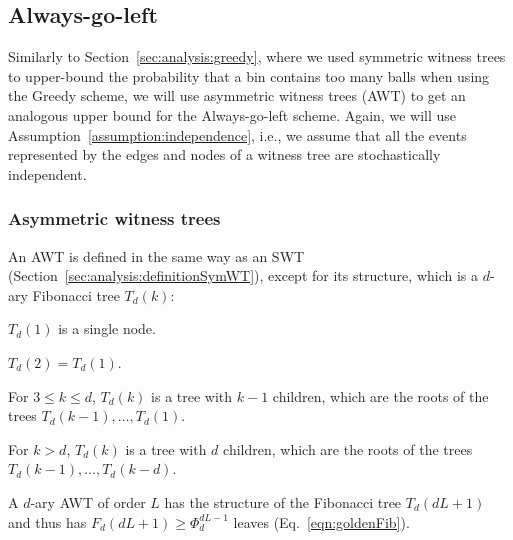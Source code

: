 \documentclass[a4paper,12pt]{article}
\begin{document}
\subsection{Always-go-left}
\label{sec:analysis:alg}
Similarly to Section~\ref{sec:analysis:greedy}, where we used symmetric witness trees to upper-bound the probability that a bin contains too many balls when using the Greedy scheme, we will use asymmetric witness trees (AWT) to get an analogous upper bound for the Always-go-left scheme. Again, we will use Assumption~\ref{assumption:independence}, i.e., we assume that all the events represented by the edges and nodes of a witness tree are stochastically independent.

\subsubsection{Asymmetric witness trees}
\label{sec:analysis:definitionAsymWT}
An AWT is defined in the same way as an SWT  (Section~\ref{sec:analysis:definitionSymWT}), except for its structure, which is a $d$-ary Fibonacci tree $T_d\left(k \right)$:

\begin{compactitem}
\item $T_d(1)$ is a single node.
\item $T_d(2) = T_d(1)$.
\item For $3\leq k \leq d$, $T_d(k)$ is a tree with $k-1$ children, which are the roots of the trees $T_d(k-1),\ldots,T_d(1)$.
\item For $k>d$, $T_d(k)$ is a tree with $d$ children, which are the roots of the trees $T_d(k-1),\ldots,T_d(k-d)$.
\end{compactitem}
A $d$-ary AWT of order $L$ has the structure of the Fibonacci tree $T_d(d  L+1)$ and thus has $F_d(d L + 1) \geq \Phi_d^{d L-1}$ leaves (Eq.~\ref{eqn:goldenFib}). 
\end{document}
